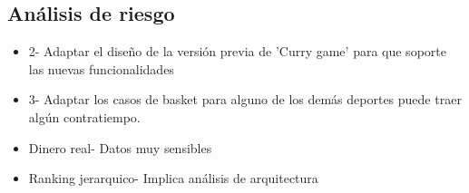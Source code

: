 \subsection{Análisis de riesgo}

\begin{itemize}
  \item 2- Adaptar el diseño de la versión previa de 'Curry game' para que soporte las nuevas funcionalidades
  \item 3- Adaptar los casos de basket para alguno de los demás deportes puede traer algún contratiempo.
  \item Dinero real- Datos muy sensibles
  \item Ranking jerarquico- Implica análisis de arquitectura
\end{itemize}

